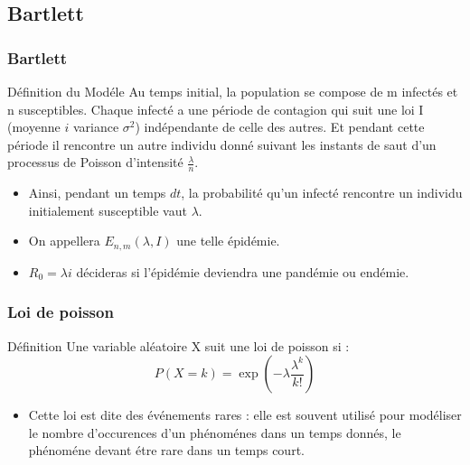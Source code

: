 \subsection{Bartlett}

\begin{frame}
    \frametitle{Bartlett}

    \begin{block}{Définition du Modéle}
        Au temps initial, la population se compose de m infectés et n susceptibles. Chaque infecté a une période de contagion qui suit une loi I (moyenne $i$ variance $\sigma^2$) indépendante de celle des autres. Et pendant cette période il rencontre un autre individu donné suivant les instants de saut d’un processus de Poisson d’intensité $\frac{\lambda}{n}$.
    \end{block}

    \begin{itemize}
        \item Ainsi, pendant un temps $dt$, la probabilité qu’un infecté rencontre un individu initialement susceptible vaut $\lambda$.
        \item On appellera $E_{n,m}(\lambda, I)$ une telle épidémie.
        \item $R_0 = \lambda i$ décideras si l'épidémie deviendra une pandémie ou endémie.
    \end{itemize}

\end{frame}

\begin{frame}
    \frametitle{Loi de poisson}

    \begin{block}{Définition}
        Une variable aléatoire X suit une loi de poisson si :
        $$ P(X=k) = \exp(-\lambda \frac{\lambda^k}{k!}) $$
    \end{block}

    \begin{itemize}
        \item Cette loi est dite des événements rares : elle est souvent utilisé pour modéliser le nombre d'occurences d'un phénoménes dans un temps donnés, le phénoméne devant étre rare dans un temps court.
    \end{itemize}

\end{frame}
